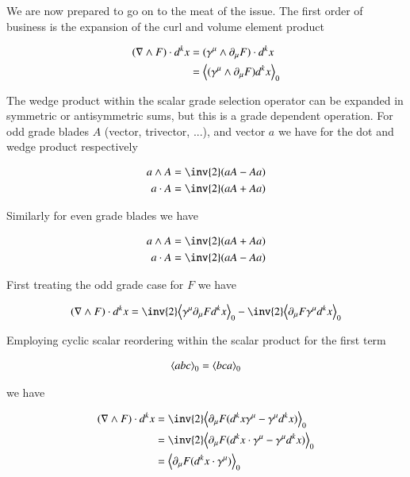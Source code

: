 We are now prepared to go on to the meat of the issue.  The first order of business is the expansion of the curl and volume element product

\begin{align*}
( \nabla \wedge F ) \cdot d^k x
&=
( \gamma^\mu \wedge \partial_\mu F ) \cdot d^k x \\
&=
{\left\langle{{ ( \gamma^\mu \wedge \partial_\mu F ) d^k x }}\right\rangle}_{0} \\
\end{align*}

The wedge product within the scalar grade selection operator can be expanded in symmetric or antisymmetric sums, but this is a grade dependent operation.  For odd grade blades $A$ (vector, trivector, ...), and vector $a$ we have for the dot and wedge product respectively

\begin{align*}
a \wedge A = \inv{2} (a A - A a) \\
a \cdot A = \inv{2} (a A + A a)
\end{align*}

Similarly for even grade blades we have

\begin{align*}
a \wedge A = \inv{2} (a A + A a) \\
a \cdot A = \inv{2} (a A - A a)
\end{align*}

First treating the odd grade case for $F$ we have

\begin{align*}
( \grad \wedge F ) \cdot d^k x
&=
\inv{2} \gpgradezero{ \gamma^\mu \partial_\mu F d^k x } - \inv{2} \gpgradezero{ \partial_\mu F \gamma^\mu d^k x } \\
\end{align*}

Employing cyclic scalar reordering within the scalar product for the first term

\begin{align}
{\left\langle{{a b c}}\right\rangle}_{0} = {\left\langle{{b c a}}\right\rangle}_{0}
\end{align}

we have

\begin{align*}
( \grad \wedge F ) \cdot d^k x
&=
\inv{2} \gpgradezero{ \partial_\mu F (d^k x \gamma^\mu - \gamma^\mu d^k x)} \\
&=
\inv{2} \gpgradezero{ \partial_\mu F (d^k x \cdot \gamma^\mu - \gamma^\mu d^k x)} \\
&=
\gpgradezero{ \partial_\mu F (d^k x \cdot \gamma^\mu)} \\
\end{align*}

